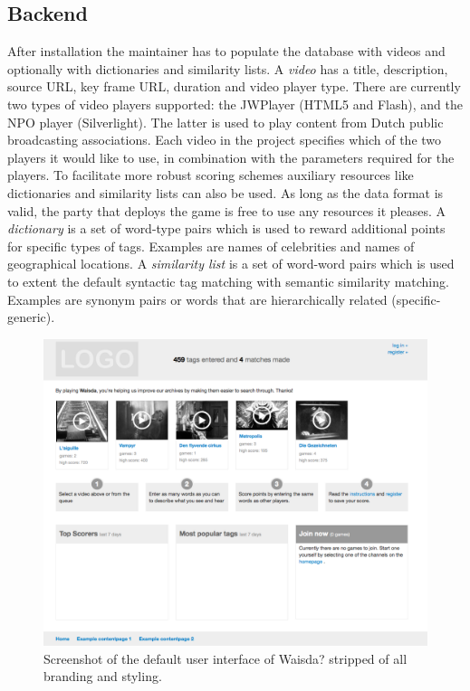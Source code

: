 \subsection{Backend}
After installation the maintainer has to populate the database with videos and optionally with dictionaries and similarity lists. A \textit{video} has a title, description, source URL, key frame URL, duration and video player type. There are currently two types of video players supported: the JWPlayer (HTML5 and Flash), and the NPO player (Silverlight). The latter is used to play content from Dutch public broadcasting associations. Each video in the project specifies which of the two players it would like to use, in combination with the parameters required for the players. To facilitate more robust scoring schemes auxiliary resources like dictionaries and similarity lists can also be used. As long as the data format is valid, the party that deploys the game is free to use any resources it pleases. A \textit{dictionary} is a set of word-type pairs which is used to reward additional points for specific types of tags. Examples are names of celebrities and names of geographical locations. A \textit{similarity list} is a set of word-word pairs which is used to extent the default syntactic tag matching with semantic similarity matching. Examples are synonym pairs or words that are hierarchically related (specific-generic).

\begin{figure}[t]
\centering
\includegraphics[width=\columnwidth]{figs/waisdastripped} 
\caption{Screenshot of the default user interface of Waisda? stripped of all branding and styling.}
\label{waisdastripped}
\end{figure}

